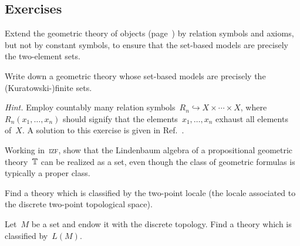 \documentclass{ws-rv9x6}
\begin{document}
{\subsection*{Exercises}

\begin{exercise}%
\begin{alphlist}[(c)]
\item Extend the geometric theory of objects
(page~\pageref{item:theory-of-objects}) by relation symbols and axioms, but not by
constant symbols, to ensure that the set-based models are precisely the
two-element sets.
\item Write down a geometric theory whose set-based models are precisely the
(Kuratowski-)finite sets.\smallskip

{\scriptsize\emph{Hint.} Employ countably many relation symbols~$R_n
\hookrightarrow X \times \cdots \times X$, where~$R_n(x_1,\ldots,x_n)$ should
signify that the elements~$x_1,\ldots,x_n$ exhaust all elements of~$X$. A
solution to this exercise is given in Ref.~\cite[Example~D1.1.7(k)]{johnstone:elephant}.\par}
\end{alphlist}
\end{exercise}

\begin{exercise}%
Working in~\textsc{izf}, show that the Lindenbaum algebra of a propositional
geometric theory~$\mathbb{T}$ can be realized as a set, even though the class of
geometric formulas is typically a proper class.\smallskip

\end{exercise}

\begin{exercise}%
\begin{alphlist}[(b)]
\item Find a theory which is classified by the two-point locale (the locale
associated to the discrete two-point topological space).
\item Let~$M$ be a set and endow it with the discrete topology. Find a theory
which is classified by~$L(M)$.
\end{alphlist}
\end{exercise}

}
\end{document}
